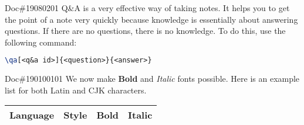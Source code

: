 \documentclass{flownotes}
\begin{document}
\clearpage
\begin{notebox}{Doc\#19080201}
Q\&A is a very effective way of taking notes. It helps you to get the point of a note very quickly because knowledge is essentially about answering questions. If there are no questions, there is no knowledge.
To do this, use the following command:
\begin{lstlisting}[language=TeX,
                  basicstyle=\coding,
                  commentstyle=\color{gray}]
    \qa[<q&a id>]{<question>}{<answer>}
\end{lstlisting}
\end{notebox}
\begin{notebox}{Doc\#190100101}
We now make \textbf{Bold} and \textit{Italic} fonts possible. Here is an example list for both Latin and CJK characters.

{\centering
\begin{tabular}{cccc}
                \toprule
                \multicolumn{1}{c}{\textbf{Language}} &
                \multicolumn{1}{c}{\textbf{Style}} &
                \multicolumn{1}{c}{\textbf{Bold}} &
                \multicolumn{1}{c}{\textbf{Italic}}  \\
                \midrule


\end{tabular}}
\end{notebox}
\end{document}
